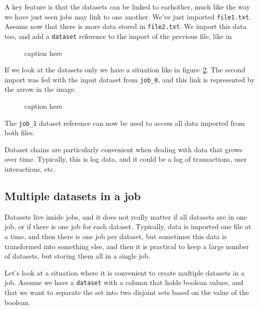 \documentclass[a4paper]{article}
\begin{document}
A key feature is that the datasets can be linked to eachother, much
like the way we have just seen jobs may link to one another.  We've
just imported \texttt{file1.txt}.  Assume now that there is more data
stored in \texttt{file2.txt}.  We import this data too, and add a
\texttt{dataset} reference to the import of the previous file, like in

\begin{figure}[h!]
  \begin{center}
    
    \caption{caption here}
    \label{fig:dataset_csvimport_chain}
  \end{center}
\end{figure}

\noindent If we look at the datasets only we have a situation like in
figure~\ref{fig:dep_dataset_csvimport_chain}.  The second import was
fed with the input dataset from \texttt{job\_0}, and this link is
represented by the arrow in the image.

\begin{figure}[h!]
  \begin{center}
    
    \caption{caption here}
    \label{fig:dep_dataset_csvimport_chain}
  \end{center}
\end{figure}

\noindent The \texttt{job\_1} dataset reference can now be used to
access all data imported from both files.

Dataset chains are particularly convenient when dealing with data that
grows over time.  Typically, this is log data, and it could be a log
of transactions, user interactions, etc.

\subsection{Multiple datasets in a job}
Datasets live inside jobs, and it does not really matter if all
datasets are in one job, or if there is one job for each dataset.
Typically, data is imported one file at a time, and then there is one
job per dataset, but sometimes this data is transformed into something
else, and then it is practical to keep a large number of datasets, but
storing them all in a single job.

Let's look at a situation where it is convenient to create multiple
datasets in a job.  Assume we have a \texttt{dataset} with a column
that holds boolean values, and that we want to separate the set into
two disjoint sets based on the value of the boolean.
\end{document}
